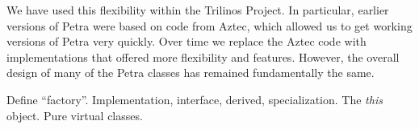 \documentclass[12pt,relax]{SANDreport}
\begin{document}
We have used this flexibility within the Trilinos Project.  In particular, earlier versions
of Petra were based on code from Aztec, which allowed us to get working versions of Petra
very quickly.  Over time we replace the Aztec code with implementations that offered more
flexibility and features.  However, the overall design of many of the Petra classes has
remained fundamentally the same.

Define ``factory''.  Implementation, interface, derived, specialization. 
The {\it this} object. Pure virtual classes.

    \begin{SANDdistribution}
	\bigskip




    \end{SANDdistribution}
\end{document}
